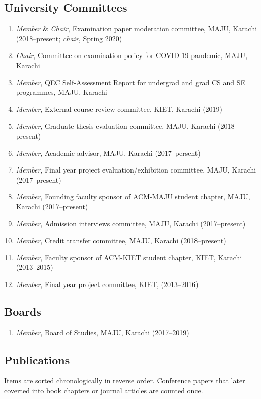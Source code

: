\documentclass[a4paper, 10pt]{article}
\begin{document}
\subsection*{\textcolor{NavyBlue}{University Committees}}
\begin{enumerate}
\itemsep-4pt
\item \emph{ Member} \& \emph{ Chair}, Examination paper moderation committee, MAJU, Karachi (2018--present; \emph{chair}, Spring 2020)
\item \emph{ Chair}, Committee on examination policy for COVID-19 pandemic, MAJU, Karachi
\item \emph{ Member}, QEC Self-Assessment Report for undergrad and grad CS and SE programmes, MAJU, Karachi
\item \emph{ Member}, External course review committee, KIET, Karachi (2019)
\item \emph{ Member}, Graduate thesis evaluation committee, MAJU, Karachi (2018--present)
\item \emph{ Member}, Academic advisor, MAJU, Karachi (2017--persent)
\item\emph{ Member}, Final year project evaluation/exhibition committee, MAJU, Karachi (2017--present)
\item \emph{ Member}, Founding faculty sponsor of ACM-MAJU student chapter, MAJU, Karachi (2017--present)
\item \emph{ Member}, Admission interviews committee, MAJU, Karachi (2017--present)
\item \emph{ Member}, Credit transfer committee, MAJU, Karachi (2018--present)
\item \emph{ Member}, Faculty sponsor of ACM-KIET student chapter, KIET, Karachi (2013--2015)
\item \emph{ Member}, Final year project committee, KIET, (2013--2016)
\end{enumerate}

\subsection*{\textcolor{NavyBlue}{Boards}}
\begin{enumerate}
\itemsep-4pt
\item \emph{ Member}, Board of Studies, MAJU, Karachi (2017--2019)
\end{enumerate}

\subsection*{\textcolor{NavyBlue}{Publications}}
\label{publications}
Items are sorted chronologically in reverse order. Conference papers that later coverted into book chapters or journal articles are counted once.
\end{document}
